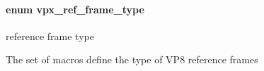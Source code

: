 \hypertarget{group__vp8_gad8ab72d8a178a68339dad2987358c331}{
\paragraph[{vpx\-\_\-ref\-\_\-frame\-\_\-type}]{\setlength{\rightskip}{0pt plus 5cm}enum {\bf vpx\-\_\-ref\-\_\-frame\-\_\-type}}}\label{group__vp8_gad8ab72d8a178a68339dad2987358c331}


reference frame type 

The set of macros define the type of V\-P8 reference frames 
